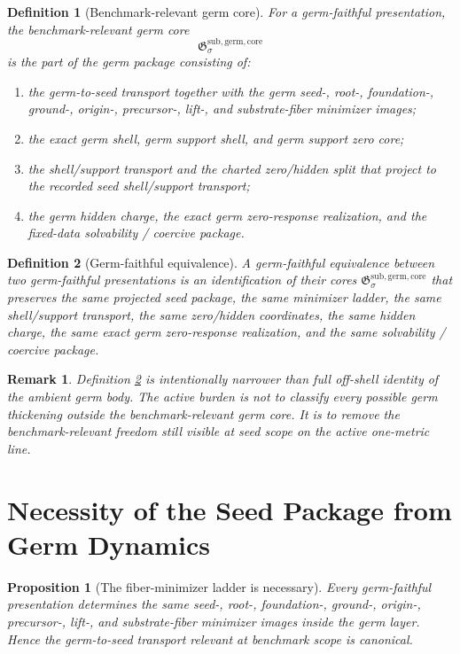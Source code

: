 \documentclass[11pt]{article}
\newcommand{\GermCore}{\mathfrak G^{\mathrm{sub,germ,core}}}
\newtheorem{definition}{Definition}
\newtheorem{proposition}{Proposition}
\newtheorem{remark}{Remark}
\begin{document}
\begin{definition}[Benchmark-relevant germ core]
\label{def:germcore}
For a germ-faithful presentation, the \emph{benchmark-relevant germ core}
\[
\GermCore_{\sigma}
\]
is the part of the germ package consisting of:
\begin{enumerate}
    \item the germ-to-seed transport together with the germ seed-, root-, foundation-, ground-, origin-, precursor-, lift-, and substrate-fiber minimizer images;
    \item the exact germ shell, germ support shell, and germ support zero core;
    \item the shell/support transport and the charted zero/hidden split that project to the recorded seed shell/support transport;
    \item the germ hidden charge, the exact germ zero-response realization, and the fixed-data solvability / coercive package.
\end{enumerate}
\end{definition}

\begin{definition}[Germ-faithful equivalence]
\label{def:equiv}
A \emph{germ-faithful equivalence} between two germ-faithful presentations is an identification of their cores \(\GermCore_{\sigma}\) that preserves the same projected seed package, the same minimizer ladder, the same shell/support transport, the same zero/hidden coordinates, the same hidden charge, the same exact germ zero-response realization, and the same solvability / coercive package.
\end{definition}

\begin{remark}
Definition \ref{def:equiv} is intentionally narrower than full off-shell identity of the ambient germ body. The active burden is not to classify every possible germ thickening outside the benchmark-relevant germ core. It is to remove the benchmark-relevant freedom still visible at seed scope on the active one-metric line.
\end{remark}

\section{Necessity of the Seed Package from Germ Dynamics}

\begin{proposition}[The fiber-minimizer ladder is necessary]
\label{prop:minimizers}
Every germ-faithful presentation determines the same seed-, root-, foundation-, ground-, origin-, precursor-, lift-, and substrate-fiber minimizer images inside the germ layer. Hence the germ-to-seed transport relevant at benchmark scope is canonical.
\end{proposition}
\end{document}
